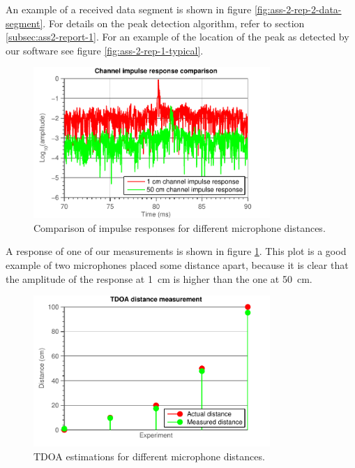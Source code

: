 \documentclass[11pt,titlepage]{report}
\begin{document}
An example of a received data segment is shown in figure \ref{fig:ass-2-rep-2-data-segment}. For details on the peak detection algorithm, refer to section \ref{subsec:ass2-report-1}. For an example of the location of the peak as detected by our software see figure \ref{fig:ass-2-rep-1-typical}.

\begin{figure}[H]
	\centering
	\includegraphics[width=0.8\textwidth]{../../deliverable-7-resources/figures/ass-2/report-2-3/ass-2-report-2-impulse-responses-4.pdf}
	\caption{Comparison of impulse responses for different microphone distances.}
	\label{fig:ass-2-rep-2-impulse-1-20}
\end{figure}

A response of one of our measurements is shown in figure \ref{fig:ass-2-rep-2-impulse-1-20}. This plot is a good example of two microphones placed some distance apart, because it is clear that the amplitude of the response at \SI{1}{cm} is higher than the one at \SI{50}{cm}. 

\begin{figure}[H]
	\centering
	\includegraphics[width=0.8\textwidth]{../../deliverable-7-resources/figures/ass-2/report-2-3/ass-2-report-2-results.pdf}
	\caption{TDOA estimations for different microphone distances.}
	\label{fig:ass-2-rep-2-result}
\end{figure}
\end{document}

